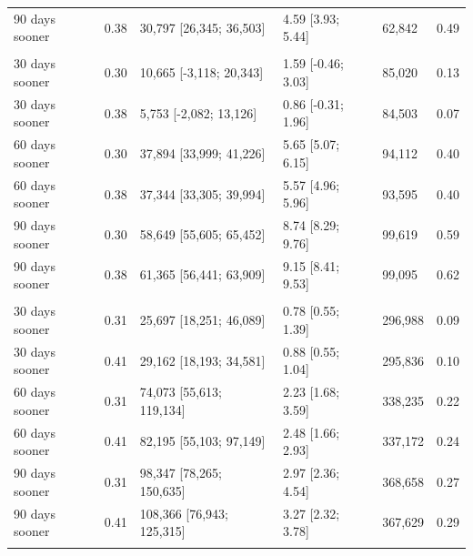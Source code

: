 \documentclass{article}
\begin{document}
\begin{table}
\begin{tabular}[t]{lrlllr}
\hspace{1em}90 days sooner & 0.38 & 30,797 [26,345; 36,503] & 4.59 [3.93; 5.44] & 62,842 & 0.49\\
\addlinespace[0.3em]
\multicolumn{6}{l}{\textbf{UK to Jan 2022}}\\
\hspace{1em}30 days sooner & 0.30 & 10,665 [-3,118; 20,343] & 1.59 [-0.46; 3.03] & 85,020 & 0.13\\
\hspace{1em}30 days sooner & 0.38 & 5,753 [-2,082; 13,126] & 0.86 [-0.31; 1.96] & 84,503 & 0.07\\
\hspace{1em}60 days sooner & 0.30 & 37,894 [33,999; 41,226] & 5.65 [5.07; 6.15] & 94,112 & 0.40\\
\hspace{1em}60 days sooner & 0.38 & 37,344 [33,305; 39,994] & 5.57 [4.96; 5.96] & 93,595 & 0.40\\
\hspace{1em}90 days sooner & 0.30 & 58,649 [55,605; 65,452] & 8.74 [8.29; 9.76] & 99,619 & 0.59\\
\hspace{1em}90 days sooner & 0.38 & 61,365 [56,441; 63,909] & 9.15 [8.41; 9.53] & 99,095 & 0.62\\
\addlinespace[0.3em]
\multicolumn{6}{l}{\textbf{US to April 2021}}\\
\hspace{1em}30 days sooner & 0.31 & 25,697 [18,251; 46,089] & 0.78 [0.55; 1.39] & 296,988 & 0.09\\
\hspace{1em}30 days sooner & 0.41 & 29,162 [18,193; 34,581] & 0.88 [0.55; 1.04] & 295,836 & 0.10\\
\hspace{1em}60 days sooner & 0.31 & 74,073 [55,613; 119,134] & 2.23 [1.68; 3.59] & 338,235 & 0.22\\
\hspace{1em}60 days sooner & 0.41 & 82,195 [55,103; 97,149] & 2.48 [1.66; 2.93] & 337,172 & 0.24\\
\hspace{1em}90 days sooner & 0.31 & 98,347 [78,265; 150,635] & 2.97 [2.36; 4.54] & 368,658 & 0.27\\
\hspace{1em}90 days sooner & 0.41 & 108,366 [76,943; 125,315] & 3.27 [2.32; 3.78] & 367,629 & 0.29\\
\addlinespace[0.3em]
\multicolumn{6}{l}{\textbf{US to July 2021}}\\

\end{tabular}
\end{table}
\end{document}
